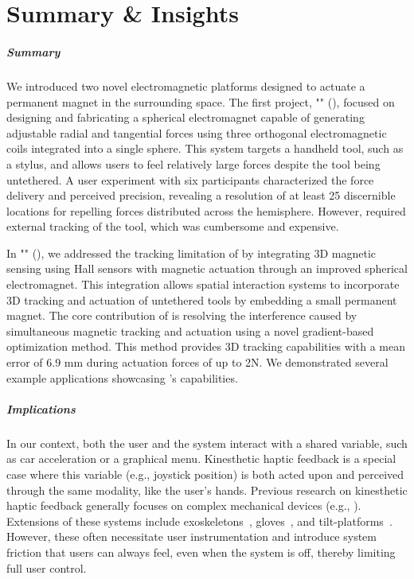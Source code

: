 \chapter{Summary \& Insights}
\label{ch:shared:conclusion}

\paragraph{Summary}
We introduced two novel electromagnetic platforms designed to actuate a permanent magnet in the surrounding space. The first project, "\omniHapTitle" (), focused on designing and fabricating a spherical electromagnet capable of generating adjustable radial and tangential forces using three orthogonal electromagnetic coils integrated into a single sphere. This system targets a handheld tool, such as a stylus, and allows users to feel relatively large forces despite the tool being untethered. A user experiment with six participants characterized the force delivery and perceived precision, revealing a resolution of at least 25 discernible locations for repelling forces distributed across the hemisphere. However, \omniHap required external tracking of the tool, which was cumbersome and expensive.

In "\omniUISTTitle" (), we addressed the tracking limitation of \omniHap by integrating 3D magnetic sensing using Hall sensors with magnetic actuation through an improved spherical electromagnet. This integration allows spatial interaction systems to incorporate 3D tracking and actuation of untethered tools by embedding a small permanent magnet. The core contribution of \omniUIST is resolving the interference caused by simultaneous magnetic tracking and actuation using a novel gradient-based optimization method. This method provides 3D tracking capabilities with a mean error of 6.9 mm during actuation forces of up to 2N. We demonstrated several example applications showcasing \omniUIST's capabilities.

\paragraph{Implications}
In our context, both the user and the system interact with a shared variable, such as car acceleration or a graphical menu. Kinesthetic haptic feedback is a special case where this variable (e.g., joystick position) is both acted upon and perceived through the same modality, like the user's hands. Previous research on kinesthetic haptic feedback generally focuses on complex mechanical devices (e.g., \cite{Massie94, Stamper1997, VanDerLinde2002, Araujo2016, zoller2019assessment, Sinclair2019Capstan}). Extensions of these systems include exoskeletons~\cite{Gu2016, Choi2016}, gloves~\cite{Cybergrasp, hinchet2018dextres}, and tilt-platforms~\cite{Prattichizzo2013, Kim2016}. However, these often necessitate user instrumentation and introduce system friction that users can always feel, even when the system is off, thereby limiting full user control.

